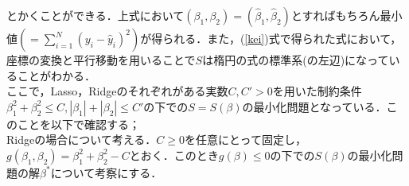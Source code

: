 \documentclass{jsarticle}
\theoremstyle{definition}
\theoremstyle{mystyle} %
\begin{document}
とかくことができる．上式において$(\beta_1,\beta_2)=(\hat{\beta}_1,\hat{\beta}_2)$とすればもちろん最小値$(= \sum_{i=1}^N (y_i-\hat{y}_i)^2)$が得られる．また，(\ref{kei})式で得られた式において，座標の変換と平行移動を用いることで$S$は楕円の式の標準系(の左辺)になっていることがわかる．\\

ここで，Lasso，Ridgeのそれぞれがある実数$C,C'>0$を用いた制約条件$\beta_1^2+\beta_2^2\leq C,|\beta_1|+|\beta_2|\leq C'$の下での$S=S(\beta)$の最小化問題となっている．このことを以下で確認する；\\

Ridgeの場合について考える．$C\geq0$を任意にとって固定し，$g(\beta_1,\beta_2)=\beta_1^2+\beta_2^2-C$とおく．このとき$g(\beta)\leq 0$の下での$S(\beta)$の最小化問題の解$\beta^{\ast}$について考察にする．\\
\end{document}
